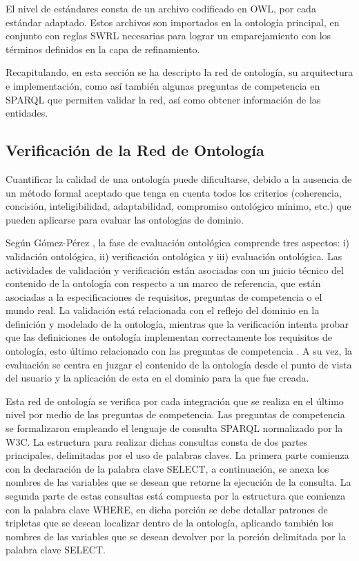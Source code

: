 \documentclass[journal]{IEEEtran}
\begin{document}
El nivel de est\'andares consta de un archivo codificado en OWL, por cada est\'andar adaptado. Estos archivos son importados en la ontolog\'ia principal, en conjunto con reglas SWRL necesarias para lograr un emparejamiento con los t\'erminos definidos en la capa de refinamiento.

Recapitulando, en esta secci\'on se ha descripto la red de ontolog\'ia, su arquitectura e implementaci\'on, como as\'i tambi\'en algunas preguntas de competencia en SPARQL que permiten validar la red, as\'i como obtener informaci\'on de las entidades. 



\subsection{Verificaci\'on de la Red de Ontolog\'ia}

Cuantificar la calidad de una ontolog\'ia puede dificultarse, debido a la ausencia de un método formal aceptado que tenga en cuenta todos los criterios (coherencia, concisi\'on, inteligibilidad, adaptabilidad, compromiso ontol\'ogico m\'inimo, etc.) que pueden aplicarse para evaluar las ontolog\'ias de dominio.

Seg\'un G\'omez-P\'erez \cite{Gomez-Perez2007OntologicalWeb}, la fase de evaluaci\'on ontol\'ogica comprende tres aspectos: i) validaci\'on ontol\'ogica, ii) verificaci\'on ontol\'ogica y iii) evaluaci\'on ontol\'ogica. Las actividades de validaci\'on y verificaci\'on est\'an asociadas con un juicio t\'ecnico del contenido de la ontolog\'ia con respecto a un marco de referencia, que est\'an asociadas a la especificaciones de requisitos, preguntas de competencia o el mundo real. La validaci\'on est\'a relacionada con el reflejo del dominio en la definici\'on y modelado de la ontolog\'ia, mientras que la verificaci\'on intenta probar que las definiciones de ontolog\'ia implementan correctamente los requisitos de ontolog\'ia, esto \'ultimo relacionado con las preguntas de competencia \cite{Bezerra2013EvaluatingQuestions}. A su vez, la evaluaci\'on se centra en juzgar el contenido de la ontolog\'ia desde el punto de vista del usuario y la aplicaci\'on de esta en el dominio para la que fue creada. 

Esta red de ontolog\'ia se verifica por cada integraci\'on que se realiza en el \'ultimo nivel por medio de las preguntas de competencia. Las preguntas de competencia se formalizaron empleando el lenguaje de consulta SPARQL normalizado por la W3C. La estructura para realizar dichas consultas consta de dos partes principales, delimitadas por el uso de palabras claves. La primera parte comienza con la declaraci\'on de la palabra clave SELECT, a continuaci\'on, se anexa los nombres de las variables que se desean que retorne la ejecuci\'on de la consulta. La segunda parte de estas consultas est\'a compuesta por la estructura que comienza con la palabra clave WHERE, en dicha porci\'on se debe detallar patrones de tripletas que se desean localizar dentro de la ontolog\'ia, aplicando tambi\'en los nombres de las variables que se desean devolver por la porci\'on delimitada por la palabra clave SELECT. 
\end{document}
